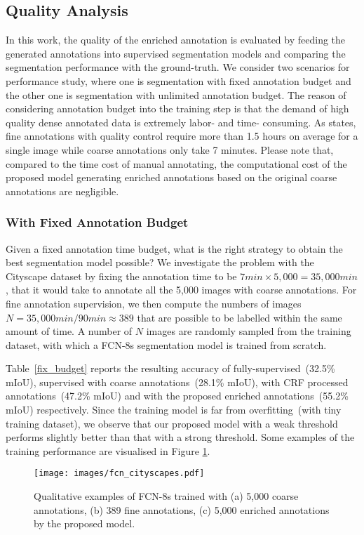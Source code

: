 \documentclass[sigconf]{acmart}
\begin{document}
\subsection{Quality Analysis}
In this work, the quality of the enriched annotation is evaluated by feeding the generated annotations into supervised segmentation models and comparing the segmentation performance with the ground-truth. We consider two scenarios for performance study, where one is segmentation with fixed annotation budget and the other one is segmentation with unlimited annotation budget. The reason of considering annotation budget into the training step is that the demand of high quality dense annotated data is extremely labor- and time- consuming. As \cite{cityscapes} states, fine annotations with quality control require more than 1.5 hours on average for a single image while coarse annotations only take 7 minutes. Please note that, compared to the time cost of manual annotating, the computational cost of the proposed model generating enriched annotations based on the original coarse annotations are negligible.

\subsubsection{With Fixed Annotation Budget}
Given a fixed annotation time budget, what is the right strategy to obtain the best segmentation model possible? We investigate the problem with the Cityscape dataset by fixing the annotation time to be $7min\times 5,000 = 35,000 min$, that it would take to annotate all the 5,000 images with coarse annotations. For fine annotation supervision, we then compute the numbers of images $N = 35,000min / 90min \approx 389$ that are possible to be labelled within the same amount of time. A number of $N$ images are randomly sampled from the training dataset, with which a FCN-8s segmentation model is trained from scratch.

Table~\ref{fix_budget} reports the resulting accuracy of fully-supervised~(32.5\% mIoU), supervised with coarse annotations~(28.1\% mIoU), with CRF processed annotations~(47.2\% mIoU) and with the proposed enriched annotations~(55.2\% mIoU) respectively. Since the training model is far from overfitting~(with tiny training dataset), we observe that our proposed model with a weak threshold performs slightly better than that with a strong threshold. Some examples of the training performance are visualised in Figure \ref{fig:fcn_cityscapes}.
\begin{figure}[!htb]
	\centering
	\texttt{[image: images/fcn\_cityscapes.pdf]}
	\caption{Qualitative examples of FCN-8s trained with (a) 5,000 coarse annotations, (b) 389 fine annotations, (c) 5,000 enriched annotations by the proposed model.}
	\label{fig:fcn_cityscapes}
\end{figure}
\end{document}
